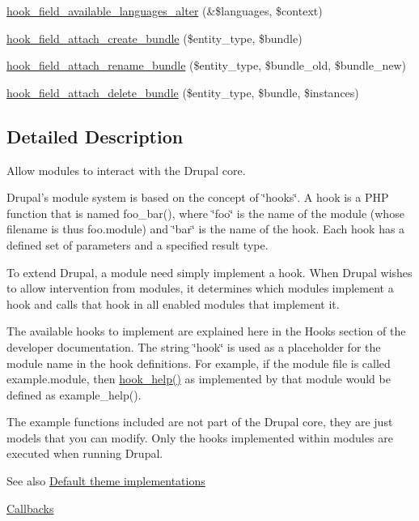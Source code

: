 \begin{DoxyCompactItemize}
\hyperlink{group__field__attach_gaea2e719de3ad070e161d0d386dd18303}{hook\_\-field\_\-available\_\-languages\_\-alter} (\&\$languages, \$context)
\item 
\hyperlink{group__field__attach_gad2e99b8b55c106c289a8241db00f0f30}{hook\_\-field\_\-attach\_\-create\_\-bundle} (\$entity\_\-type, \$bundle)
\item 
\hyperlink{group__field__attach_gaf218d913150bda6004d5d8e112d3174a}{hook\_\-field\_\-attach\_\-rename\_\-bundle} (\$entity\_\-type, \$bundle\_\-old, \$bundle\_\-new)
\item 
\hyperlink{group__field__attach_gac2aac33854dd18a2037a13b133c26481}{hook\_\-field\_\-attach\_\-delete\_\-bundle} (\$entity\_\-type, \$bundle, \$instances)
\end{DoxyCompactItemize}


\subsection{Detailed Description}
Allow modules to interact with the Drupal core.

Drupal's module system is based on the concept of \char`\"{}hooks\char`\"{}. A hook is a PHP function that is named foo\_\-bar(), where \char`\"{}foo\char`\"{} is the name of the module (whose filename is thus foo.module) and \char`\"{}bar\char`\"{} is the name of the hook. Each hook has a defined set of parameters and a specified result type.

To extend Drupal, a module need simply implement a hook. When Drupal wishes to allow intervention from modules, it determines which modules implement a hook and calls that hook in all enabled modules that implement it.

The available hooks to implement are explained here in the Hooks section of the developer documentation. The string \char`\"{}hook\char`\"{} is used as a placeholder for the module name in the hook definitions. For example, if the module file is called example.module, then \hyperlink{group__hooks_ga5589c2714a782738e8851c4c90231f0e}{hook\_\-help()} as implemented by that module would be defined as example\_\-help().

The example functions included are not part of the Drupal core, they are just models that you can modify. Only the hooks implemented within modules are executed when running Drupal.

\begin{DoxySeeAlso}{See also}
\hyperlink{group__themeable}{Default theme implementations} 

\hyperlink{group__callbacks}{Callbacks} 
\end{DoxySeeAlso}


